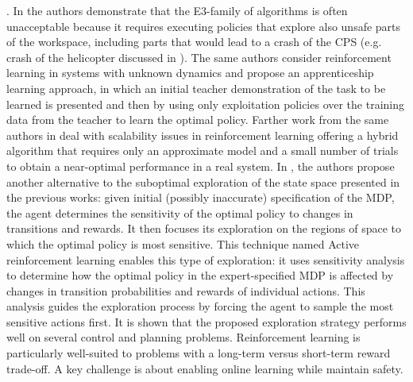 . 
In \cite{abbeel2005exploration} the authors demonstrate that the E3-family of algorithms \cite{kearns2002near} is often unacceptable because it requires executing policies that explore also unsafe parts of the workspace, including parts that would lead to a crash of the CPS (e.g. crash of the helicopter discussed in \cite{abbeel2005exploration}). The same authors consider reinforcement learning in systems with unknown dynamics and propose an apprenticeship learning approach, in which an initial teacher demonstration of the task to be learned is presented and then by using only exploitation policies over the training data from the teacher to learn the optimal policy. Farther work from the same authors in \cite{abbeel2006using} deal with scalability issues in reinforcement learning offering a hybrid algorithm that requires only an approximate model and a small number of trials to obtain a near-optimal performance in a real system.
In \cite{epshteyn2008active}, the authors propose another alternative to the suboptimal exploration of the state space presented in the previous works: given initial (possibly inaccurate) specification of the MDP, the agent determines the sensitivity of the optimal policy to changes in transitions and rewards. It then focuses its exploration on the regions of space to which the optimal policy is most sensitive. This technique named Active reinforcement learning enables this type of exploration: it uses sensitivity analysis to determine how the optimal policy in the expert-specified MDP is affected by changes in transition probabilities and rewards of individual actions. This analysis guides the exploration process by forcing the agent to sample the most sensitive actions first. It is shown that the proposed exploration strategy performs well on several control and planning problems.
Reinforcement learning is particularly well-suited to problems with a long-term versus short-term reward trade-off. A key challenge is about enabling online learning while maintain safety.


